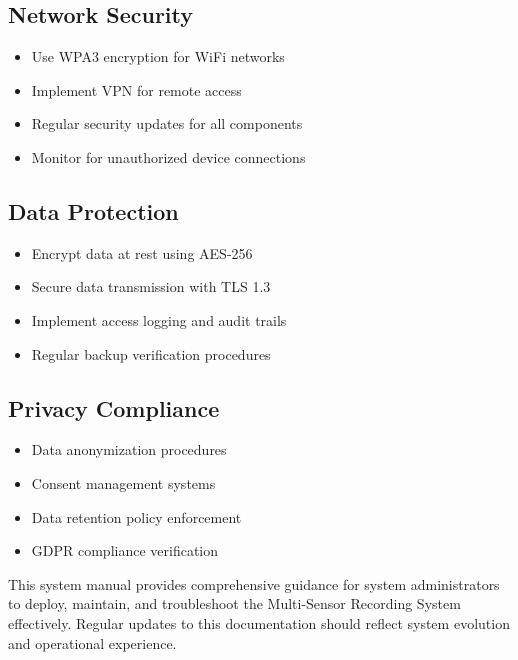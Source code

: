 \subsection{Network Security}

\begin{itemize}
\item Use WPA3 encryption for WiFi networks
\item Implement VPN for remote access
\item Regular security updates for all components
\item Monitor for unauthorized device connections
\end{itemize}

\subsection{Data Protection}

\begin{itemize}
\item Encrypt data at rest using AES-256
\item Secure data transmission with TLS 1.3
\item Implement access logging and audit trails
\item Regular backup verification procedures
\end{itemize}

\subsection{Privacy Compliance}

\begin{itemize}
\item Data anonymization procedures
\item Consent management systems
\item Data retention policy enforcement
\item GDPR compliance verification
\end{itemize}

This system manual provides comprehensive guidance for system administrators to deploy, maintain, and troubleshoot the Multi-Sensor Recording System effectively. Regular updates to this documentation should reflect system evolution and operational experience.
